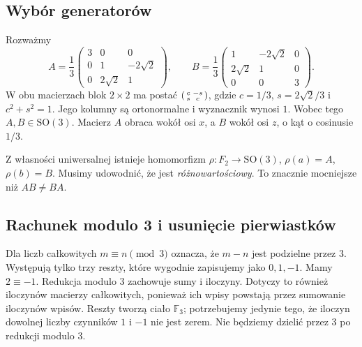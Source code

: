 \subsection{Wybór generatorów}
Rozważmy
\begin{equation}\label{eq:5-1}
 A=\frac13\begin{pmatrix}3&0&0\\0&1&-2\sqrt2\\0&2\sqrt2&1\end{pmatrix},\qquad
 B=\frac13\begin{pmatrix}1&-2\sqrt2&0\\2\sqrt2&1&0\\0&0&3\end{pmatrix}.
\end{equation}
W obu macierzach blok $2\times2$ ma postać $\begin{psmallmatrix}c&-s\\s&c\end{psmallmatrix}$, gdzie $c=1/3$, $s=2\sqrt2/3$ i $c^2+s^2=1$. Jego kolumny są ortonormalne i wyznacznik wynosi $1$. Wobec tego $A,B\in\mathrm{SO}(3)$. Macierz $A$ obraca wokół osi $x$, a $B$ wokół osi $z$, o kąt o cosinusie $1/3$.

Z własności uniwersalnej istnieje homomorfizm $\rho:F_2\to\mathrm{SO}(3)$, $\rho(a)=A$, $\rho(b)=B$. Musimy udowodnić, że jest \emph{różnowartościowy}. To znacznie mocniejsze niż $AB\ne BA$.

\subsection{Rachunek modulo 3 i usunięcie pierwiastków}
Dla liczb całkowitych $m\equiv n\pmod3$ oznacza, że $m-n$ jest podzielne przez $3$. Występują tylko trzy reszty, które wygodnie zapisujemy jako $0,1,-1$. Mamy $2\equiv-1$. Redukcja modulo $3$ zachowuje sumy i iloczyny. Dotyczy to również iloczynów macierzy całkowitych, ponieważ ich wpisy powstają przez sumowanie iloczynów wpisów. Reszty tworzą ciało $\mathbb F_3$; potrzebujemy jedynie tego, że iloczyn dowolnej liczby czynników $1$ i $-1$ nie jest zerem. Nie będziemy dzielić przez $3$ po redukcji modulo $3$.

